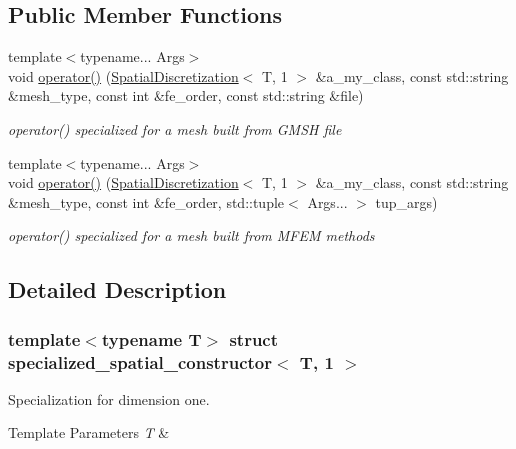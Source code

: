 \subsection*{Public Member Functions}
\begin{DoxyCompactItemize}
\item 
{\footnotesize template$<$typename... Args$>$ }\\void \hyperlink{structspecialized__spatial__constructor_3_01T_00_011_01_4_adac65e910d9ef1954c2182862aa71eb8}{operator()} (\hyperlink{classSpatialDiscretization}{Spatial\+Discretization}$<$ T, 1 $>$ \&a\+\_\+my\+\_\+class, const std\+::string \&mesh\+\_\+type, const int \&fe\+\_\+order, const std\+::string \&file)
\begin{DoxyCompactList}\small\item\em operator() specialized for a mesh built from G\+M\+SH file \end{DoxyCompactList}\item 
{\footnotesize template$<$typename... Args$>$ }\\void \hyperlink{structspecialized__spatial__constructor_3_01T_00_011_01_4_af1e3b2d10b46b73d71983500b594b3f3}{operator()} (\hyperlink{classSpatialDiscretization}{Spatial\+Discretization}$<$ T, 1 $>$ \&a\+\_\+my\+\_\+class, const std\+::string \&mesh\+\_\+type, const int \&fe\+\_\+order, std\+::tuple$<$ Args... $>$ tup\+\_\+args)
\begin{DoxyCompactList}\small\item\em operator() specialized for a mesh built from M\+F\+EM methods \end{DoxyCompactList}\end{DoxyCompactItemize}


\subsection{Detailed Description}
\subsubsection*{template$<$typename T$>$\newline
struct specialized\+\_\+spatial\+\_\+constructor$<$ T, 1 $>$}

Specialization for dimension one. 


\begin{DoxyTemplParams}{Template Parameters}
{\em T} & \\
\hline
\end{DoxyTemplParams}


